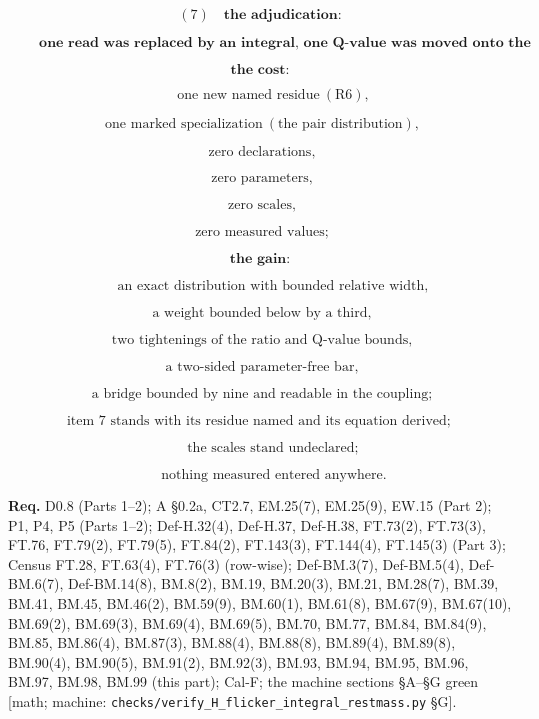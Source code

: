 \documentclass[11pt,openany]{report}
\theoremstyle{canonplain}
\theoremstyle{canondef}
\begin{document}
\[
(7)\quad\textbf{the adjudication:}
\]

\[
\qquad \boxed{\ \textbf{one read was replaced by an integral, one Q-value was moved onto the rest-mass species, one line was shown to occupy a single ray, and one ledger item was closed in form}\ }
\]

\[
\textbf{the cost:}
\]

\[
\qquad \text{one new named residue}\ (\mathrm{R6}),
\]

\[
\ \ \text{one marked specialization}\ (\text{the pair distribution}),
\]

\[
\ \ \text{zero declarations},
\]

\[
\ \ \text{zero parameters},
\]

\[
\ \ \text{zero scales},
\]

\[
\ \ \text{zero measured values};
\]

\[
\textbf{the gain:}
\]

\[
\qquad \text{an exact distribution with bounded relative width},
\]

\[
\ \ \text{a weight bounded below by a third},
\]

\[
\ \ \text{two tightenings of the ratio and Q-value bounds},
\]

\[
\ \ \text{a two-sided parameter-free bar},
\]

\[
\ \ \text{a bridge bounded by nine and readable in the coupling};
\]

\[
\text{item 7 stands with its residue named and its equation derived};
\]

\[
\qquad \text{the scales stand undeclared};
\]

\[
\qquad \text{nothing measured entered anywhere}.
\]

\textbf{Req.} D0.8 (Parts 1–2); A §0.2a, CT2.7, EM.25(7), EM.25(9), EW.15 (Part 2); P1, P4, P5 (Parts 1–2); Def-H.32(4), Def-H.37, Def-H.38, FT.73(2), FT.73(3), FT.76, FT.79(2), FT.79(5), FT.84(2), FT.143(3), FT.144(4), FT.145(3) (Part 3); Census FT.28, FT.63(4), FT.76(3) (row-wise); Def-BM.3(7), Def-BM.5(4), Def-BM.6(7), Def-BM.14(8), BM.8(2), BM.19, BM.20(3), BM.21, BM.28(7), BM.39, BM.41, BM.45, BM.46(2), BM.59(9), BM.60(1), BM.61(8), BM.67(9), BM.67(10), BM.69(2), BM.69(3), BM.69(4), BM.69(5), BM.70, BM.77, BM.84, BM.84(9), BM.85, BM.86(4), BM.87(3), BM.88(4), BM.88(8), BM.89(4), BM.89(8), BM.90(4), BM.90(5), BM.91(2), BM.92(3), BM.93, BM.94, BM.95, BM.96, BM.97, BM.98, BM.99 (this part); Cal-F; the machine sections §A–§G green [math; machine: \texttt{checks/\allowbreak{}verify\_\allowbreak{}H\_\allowbreak{}flicker\_\allowbreak{}integral\_\allowbreak{}restmass.py} §G].
\end{document}
